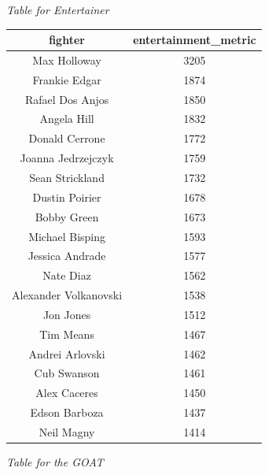 \documentclass[
  man,floatsintext]{apa6}
\begin{document}
\emph{Table for Entertainer}

\begin{tabular}{c|c}
\hline
fighter & entertainment\_metric\\
\hline
Max Holloway & 3205\\
\hline
Frankie Edgar & 1874\\
\hline
Rafael Dos Anjos & 1850\\
\hline
Angela Hill & 1832\\
\hline
Donald Cerrone & 1772\\
\hline
Joanna Jedrzejczyk & 1759\\
\hline
Sean Strickland & 1732\\
\hline
Dustin Poirier & 1678\\
\hline
Bobby Green & 1673\\
\hline
Michael Bisping & 1593\\
\hline
Jessica Andrade & 1577\\
\hline
Nate Diaz & 1562\\
\hline
Alexander Volkanovski & 1538\\
\hline
Jon Jones & 1512\\
\hline
Tim Means & 1467\\
\hline
Andrei Arlovski & 1462\\
\hline
Cub Swanson & 1461\\
\hline
Alex Caceres & 1450\\
\hline
Edson Barboza & 1437\\
\hline
Neil Magny & 1414\\
\hline
\end{tabular}

\emph{Table for the GOAT}
\end{document}
